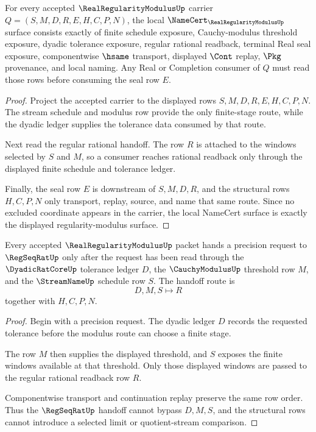 \begin{theorem}
\label{thm:real-regularity-modulus-namecert-obligations}
For every accepted $\RealRegularityModulusUp$ carrier $Q=(S,M,D,R,E,H,C,P,N)$, the local $\NameCert_{\RealRegularityModulusUp}$ surface consists exactly of finite schedule exposure, Cauchy-modulus threshold exposure, dyadic tolerance exposure, regular rational readback, terminal Real seal exposure, componentwise $\hsame$ transport, displayed $\Cont$ replay, $\Pkg$ provenance, and local naming. Any Real or Completion consumer of $Q$ must read those rows before consuming the seal row $E$.
\end{theorem}
\begin{proof}
Project the accepted carrier to the displayed rows $S,M,D,R,E,H,C,P,N$. The stream schedule and modulus row provide the only finite-stage route, while the dyadic ledger supplies the tolerance data consumed by that route.

Next read the regular rational handoff. The row $R$ is attached to the windows selected by $S$ and $M$, so a consumer reaches rational readback only through the displayed finite schedule and tolerance ledger.

Finally, the seal row $E$ is downstream of $S,M,D,R$, and the structural rows $H,C,P,N$ only transport, replay, source, and name that same route. Since no excluded coordinate appears in the carrier, the local NameCert surface is exactly the displayed regularity-modulus surface.
\end{proof}

\begin{theorem}
\label{thm:real-regularity-modulus-regseqrat-handoff}
Every accepted $\RealRegularityModulusUp$ packet hands a precision request to $\RegSeqRatUp$ only after the request has been read through the $\DyadicRatCoreUp$ tolerance ledger $D$, the $\CauchyModulusUp$ threshold row $M$, and the $\StreamNameUp$ schedule row $S$. The handoff route is
$$
D,M,S\longmapsto R
$$
together with $H,C,P,N$.
\end{theorem}
\begin{proof}
Begin with a precision request. The dyadic ledger $D$ records the requested tolerance before the modulus route can choose a finite stage.

The row $M$ then supplies the displayed threshold, and $S$ exposes the finite windows available at that threshold. Only those displayed windows are passed to the regular rational readback row $R$.

Componentwise transport and continuation replay preserve the same row order. Thus the $\RegSeqRatUp$ handoff cannot bypass $D,M,S$, and the structural rows cannot introduce a selected limit or quotient-stream comparison.
\end{proof}

